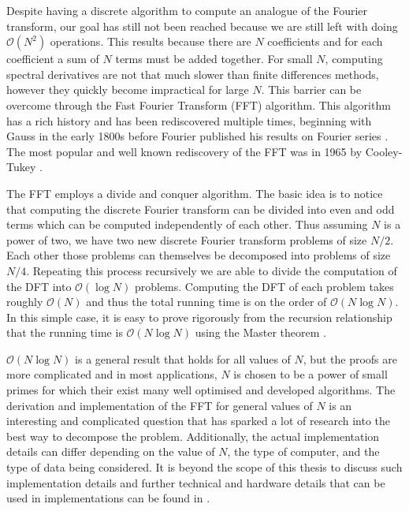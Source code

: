 Despite having a discrete algorithm to compute an analogue of the Fourier transform, our goal has still not been reached because we are still left with doing $\mathcal{O}(N^{2})$ operations. This results because there are $N$ coefficients and for each coefficient a sum of $N$ terms must be added together. For small $N$, computing spectral derivatives are not that much slower than finite differences methods, however they quickly become impractical for large $N$. This barrier can be overcome through the Fast Fourier Transform (FFT) algorithm. This algorithm has a rich history and has been rediscovered multiple times, beginning with Gauss in the early 1800s before Fourier published his results on Fourier series \cite{kammler}. The most popular and well known rediscovery of the FFT was in 1965 by Cooley-Tukey \cite{cooley1965}.

The FFT employs a divide and conquer algorithm. The basic idea is to notice that computing the discrete Fourier transform can be divided into even and odd terms which can be computed independently of each other. Thus assuming $N$ is a power of two, we have two new discrete Fourier transform problems of size $N/2$. Each other those problems can themselves be decomposed into problems of size $N/4$. Repeating this process recursively we are able to divide the computation of the DFT into $\mathcal{O}(\log N)$ problems. Computing the DFT of each problem takes roughly $\mathcal{O}(N)$ and thus the total running time is on the order of $\mathcal{O}(N\log N)$. In this simple case, it is easy to prove rigorously from the recursion relationship that the running time is $\mathcal{O}(N\log N)$ using the Master theorem \cite{clrs}.

$\mathcal{O}(N\log N)$ is a general result that holds for all values of $N$, but the proofs are more complicated and in most applications, $N$ is chosen to be a power of small primes for which their exist many well optimised and developed algorithms. The derivation and implementation of the FFT for general values of $N$ is an interesting and complicated question that has sparked a lot of research into the best way to decompose the problem. Additionally, the actual implementation details can differ depending on the value of $N$, the type of computer, and the type of data being considered. It is beyond the scope of this thesis to discuss such implementation details and further technical and hardware details that can be used in implementations can be found in \cite{fftw}.

